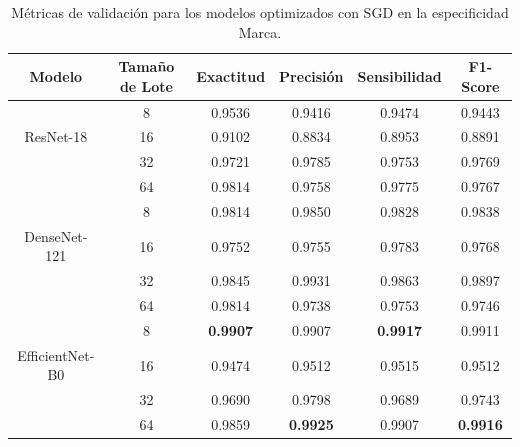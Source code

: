 \begin{table}[H]
	\begin{adjustbox}{width=1\textwidth}
		\begin{tabular}{|c|c|c|c|c|c|}
			\hline
			\textbf{Modelo} & \textbf{Tamaño de Lote} & \textbf{Exactitud} & \textbf{Precisión} & \textbf{Sensibilidad} & \textbf{F1-Score} \\
			\hline
			 & 8 & 0.9536 & 0.9416 & 0.9474 & 0.9443 \\ \cline{2-6}
			ResNet-18 & 16 & 0.9102 & 0.8834 & 0.8953 & 0.8891 \\ \cline{2-6}
			& 32 & 0.9721 & 0.9785 & 0.9753 & 0.9769 \\ \cline{2-6}
			& 64 & 0.9814 & 0.9758 & 0.9775 & 0.9767 \\
			\hline
			 & 8 & 0.9814 & 0.9850 & 0.9828 & 0.9838 \\ \cline{2-6}
			DenseNet-121 & 16 & 0.9752 & 0.9755 & 0.9783 & 0.9768 \\ \cline{2-6}
			 & 32 & 0.9845 & 0.9931  & 0.9863 & 0.9897 \\ \cline{2-6}
			 & 64 & 0.9814 & 0.9738 & 0.9753 & 0.9746 \\
			\hline
			 & 8 & \textbf{0.9907} & 0.9907 & \textbf{0.9917} & 0.9911 \\ \cline{2-6}
			EfficientNet-B0 & 16 & 0.9474 & 0.9512 & 0.9515 & 0.9512 \\ \cline{2-6}
			 & 32 & 0.9690 & 0.9798 & 0.9689 & 0.9743 \\ \cline{2-6}
			 & 64 & 0.9859 & \textbf{0.9925} & 0.9907 & \textbf{0.9916} \\
			\hline
		\end{tabular}
	\end{adjustbox}
	\caption{Métricas de validación para los modelos optimizados con SGD en la especificidad Marca.}
	\label{tab:sgd_metrics-marca}
\end{table}



